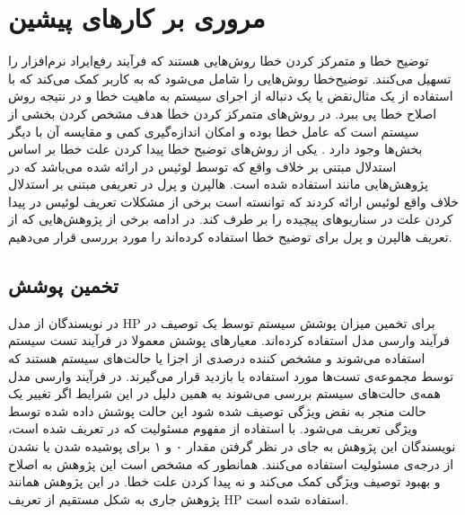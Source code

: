 \chapter{مروری بر کار‌های پیشین}
توضیح خطا
و
متمرکز کردن خطا
روش‌هایی هستند
که فرآیند رفع‌ایراد نرم‌افزار را تسهیل می‌کنند.
توضیح‌خطا روش‌هایی را شامل می‌شود که به کاربر کمک می‌کند که با استفاده از یک مثال‌نقض یا یک دنباله از اجرای سیستم به ماهیت خطا و در نتیجه روش اصلاح خطا پی ببرد.
در روش‌های متمرکز کردن خطا هدف مشخص کردن بخشی از سیستم است که عامل خطا بوده و امکان اندازه‌گیری کمی و مقایسه آن با دیگر بخش‌ها وجود دارد
\cite{groce2006error}.
یکی از روش‌های توضیح خطا پیدا کردن علت خطا بر اساس استدلال مبتنی بر خلاف واقع که توسط لوئیس در
\cite{lewis1973counterfactuals}
ارائه شده می‌باشد که در پژوهش‌هایی مانند
\cite{zeller2009programs,groce2006error,groce2003went}
استفاده شده است.
هالپرن و پرل در
\cite{hp}
تعریفی مبتنی بر استدلال خلاف واقع لوئیس ارائه کردند که توانسته است برخی از مشکلات تعریف لوئیس در پیدا کردن علت در سناریو‌های پیچیده را بر طرف کند.
در ادامه برخی از پژوهش‌هایی که از تعریف هالپرن و پرل برای توضیح خطا استفاده کرده‌اند را مورد بررسی قرار می‌دهیم.

\section{تخمین پوشش}
در
\cite{Chockler_Halpern_Kupferman_2008}
نویسندگان از مدل
HP
برای تخمین میزان پوشش
سیستم توسط یک توصیف در فرآیند وارسی مدل استفاده کرده‌اند.
معیارهای پوشش معمولا در فرآیند تست سیستم استفاده می‌شوند و مشخص کننده‌ درصدی از اجزا یا حالت‌های سیستم هستند که توسط مجموعه‌ی تست‌ها مورد استفاده یا بازدید قرار می‌گیرند.
در فرآیند وارسی مدل همه‌ی حالت‌های سیستم بررسی می‌شوند به همین دلیل در این شرایط اگر تغییر یک حالت منجر به نقض ویژگی توصیف شده شود این حالت پوشش داده شده توسط ویژگی تعریف می‌شود.
با استفاده از مفهوم مسئولیت
که در
\cite{hp2}
تعریف شده است، نویسندگان این پژوهش به جای در نظر گرفتن مقدار ۰ و ۱ برای پوشیده شدن یا نشدن از درجه‌ی مسئولیت استفاده می‌کنند.
همانطور که مشخص است این پژوهش به اصلاح و بهبود توصیف ویژگی کمک می‌کند و نه پیدا کردن علت خطا.
در این پژوهش همانند پژوهش جاری به شکل مستقیم از تعریف 
HP
استفاده شده است.

